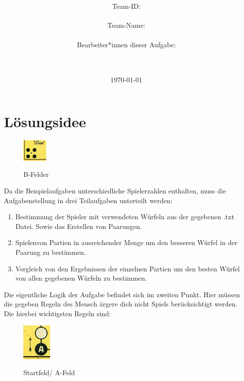 \documentclass[a4paper,11pt,ngerman]{scrartcl}
\title{\textbf{\Huge\Aufgabe}}
\author{\LARGE Team-ID: \LARGE \TeamId \\\\
	    \LARGE Team-Name: \LARGE \TeamName \\\\
	    \LARGE Bearbeiter*innen dieser Aufgabe: \\ 
	    \LARGE \Namen\\\\}
\date{\LARGE\today}
\begin{document}
\maketitle
\tableofcontents

\vspace{0.5cm}


\section{Lösungsidee}

 \begin{figure} 
 	\centering
 	\includegraphics[width=0.11\textwidth]{home}	 	
 	\caption{}
 	\small{B-Felder}
 	\label{fig:B-Felder}
 \end{figure}
Da die Beispielaufgaben unterschiedliche Spielerzahlen enthalten, muss die Aufgabenstellung in drei
Teilaufgaben unterteilt werden:

\begin{enumerate}
	
	\item Bestimmung der Spieler mit verwendeten Würfeln aus der gegebenen .txt Datei. Sowie das Erstellen von Paarungen.
	\item \glqq Spielen\grqq\space von Partien in ausreichender Menge um den besseren Würfel in der Paarung zu bestimmen.
	\item Vergleich von den Ergebnissen der einzelnen Partien um den besten Würfel von allen gegebenen Würfeln zu bestimmen.	
\end{enumerate}
Die eigentliche Logik der Aufgabe befindet sich im zweiten Punkt. Hier müssen die gegeben Regeln des Mensch ärgere dich nicht Spiels berücksichtigt werden. Die hierbei wichtigsten Regeln sind:\\
\begin{figure} 
	\centering
	\includegraphics[width=0.13\textwidth]{start}	
	\caption{}
	{\small Startfeld/ A-Feld}
	\label{fig:Startfeld}
\end{figure}
\end{document}
